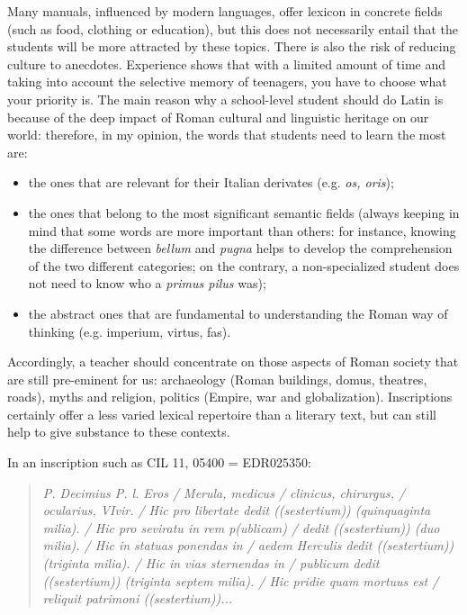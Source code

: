 \documentclass[amsthm,ebook]{saparticle}
\begin{document}
Many manuals, influenced by modern languages, offer lexicon in concrete fields (such as food, clothing or education),
but this does not necessarily entail that the students will be more attracted by these topics. There is also the risk
of reducing culture to anecdotes. Experience shows that with a limited amount of time and taking into account the
selective memory of teenagers, you have to choose what your priority is. The main reason why a school-level student
should do Latin is because of the deep impact of Roman cultural and linguistic heritage on our world: therefore, in my
opinion, the words that students need to learn the most are:

\begin{itemize}
\item the ones that are relevant for their Italian derivates (e.g. \emph{os, oris});
\item the ones that belong to the most significant semantic fields (always keeping in mind that some words are more
important than others: for instance, knowing the difference between \emph{bellum} and \emph{pugna} helps to develop the comprehension
of the two different categories; on the contrary, a non-specialized student does not need to know who a \emph{primus pilus}
was);
\item the abstract ones that are fundamental to understanding the Roman way of thinking (e.g. imperium, virtus, fas).
\end{itemize}
Accordingly, a teacher should concentrate on those aspects of Roman society that are still pre-eminent for us:
archaeology (Roman buildings, domus, theatres, roads), myths and religion, politics (Empire, war and globalization).
Inscriptions certainly offer a less varied lexical repertoire than a literary text, but can still help to give
substance to these contexts.

In an inscription such as CIL 11, 05400 = EDR025350:

\begin{quotation}
\emph{P. Decimius P. l. Eros / Merula, medicus / clinicus, chirurgus, / ocularius, VIvir. / Hic pro libertate dedit
((sestertium)) (quinquaginta milia). / Hic pro seviratu in rem p(ublicam) / dedit ((sestertium)) (duo milia). / Hic in
statuas ponendas in / aedem Herculis dedit ((sestertium)) (triginta milia). / Hic in vias sternendas in / publicum
dedit ((sestertium)) (triginta septem milia). / Hic pridie quam mortuus est / reliquit patrimoni ((sestertium))... }
\end{quotation}
\end{document}
